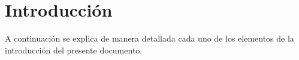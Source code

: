 \chapter{Introducción}
A continuación se explica de manera detallada cada uno de los elementos de la introducción del presente documento.




